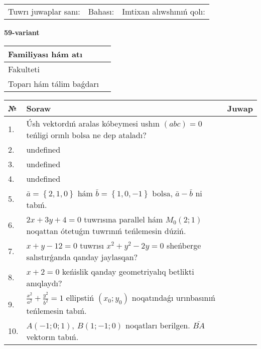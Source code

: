 \documentclass{article}
\begin{document}
\vspace{0.7cm}

\begin{tabular}{lll}
Tuwrı juwaplar sanı: \underline{\hspace{1cm}} & 
Bahası: \underline{\hspace{1cm}} & 
Imtixan alıwshınıń qolı: \underline{\hspace{2cm}} \\
\end{tabular}

\egroup

\newpage


\textbf{59-variant}\\

\bgroup
\def\arraystretch{1.6} %

\begin{tabular}{|m{5.7cm}|m{9.5cm}|}
\hline
Familiyası hám atı & \\
\hline
Fakulteti  & \\
\hline
Toparı hám tálim baǵdarı  & \\
\hline
\end{tabular}

\vspace{0.7cm}

\begin{tabular}{|m{0.7cm}|m{10cm}|m{4cm}|}
\hline
№ & Soraw & Juwap \\
\hline
1. & Úsh vektordıń aralas kóbeymesi ushın \((abc) = 0\) teńligi orınlı bolsa ne dep ataladı? &  \\
\hline
2. & undefined &  \\
\hline
3. & undefined &  \\
\hline
4. & undefined &  \\
\hline
5. & \(\bar{a} = \left\{ 2, 1, 0 \right\}\) hám \(\bar{b} = \left\{ 1, 0,- 1 \right\}\) bolsa, \(\bar{a} - \bar{b}\) ni tabıń. &  \\
\hline
6. & \(2 x + 3 y + 4 = 0\) tuwrısına parallel hám \(M_{0} (2;1)\) noqattan ótetuǵın tuwrınıń teńlemesin dúziń. &  \\
\hline
7. & \(x + y - 12 = 0\) tuwrısı \(x^{2} + y^{2} - 2 y = 0\) sheńberge salıstırǵanda qanday jaylasqan? &  \\
\hline
8. & \(x + 2 = 0\) keńislik qanday geometriyalıq betlikti anıqlaydı? &  \\
\hline
9. & \(\frac{x^{2}}{a^{2}} + \frac{y^{2}}{b^{2}} = 1\) ellipstiń \((x_{0};y_{0})\) noqatındaǵı urınbasınıń teńlemesin tabıń. &  \\
\hline
10. & \(A (- 1;0;1),\ B (1; - 1;0)\) noqatları berilgen. \(\bar{BA}\) vektorın tabıń. & \\
\hline
\end{tabular}
\end{document}
